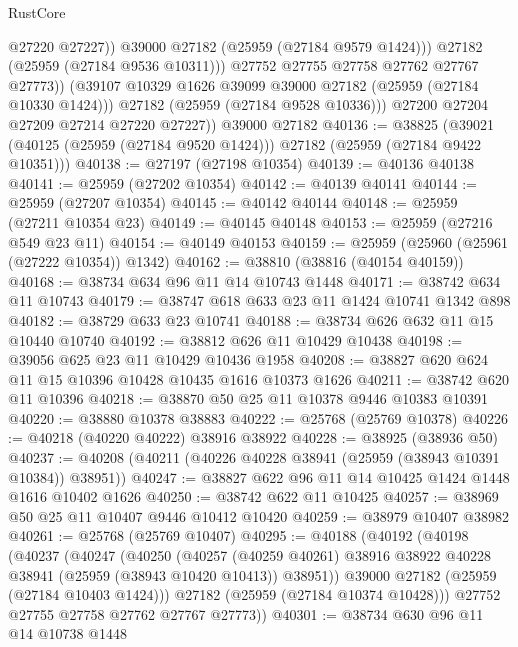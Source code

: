 \begin{lexlean}{RustCore}
\begin{coremodule}
                      @27220
                      @27227))
                  @39000
                  @27182
                  (@25959 (@27184 @9579 @1424)))
                @27182
                (@25959 (@27184 @9536 @10311)))
              @27752
              @27755
              @27758
              @27762
              @27767
              @27773))
          (@39107 @10329 @1626 @39099 @39000 @27182 (@25959 (@27184 @10330 @1424)))
          @27182
          (@25959 (@27184 @9528 @10336)))
        @27200
        @27204
        @27209
        @27214
        @27220
        @27227))
    @39000
    @27182
@40136 := @38825
    (@39021 (@40125 (@25959 (@27184 @9520 @1424))) @27182 (@25959 (@27184 @9422 @10351)))
@40138 := @27197 (@27198 @10354)
@40139 := @40136 @40138
@40141 := @25959 (@27202 @10354)
@40142 := @40139 @40141
@40144 := @25959 (@27207 @10354)
@40145 := @40142 @40144
@40148 := @25959 (@27211 @10354 @23)
@40149 := @40145 @40148
@40153 := @25959 (@27216 @549 @23 @11)
@40154 := @40149 @40153
@40159 := @25959 (@25960 (@25961 (@27222 @10354)) @1342)
@40162 := @38810 (@38816 (@40154 @40159))
@40168 := @38734 @634 @96 @11 @14 @10743 @1448
@40171 := @38742 @634 @11 @10743
@40179 := @38747 @618 @633 @23 @11 @1424 @10741 @1342 @898
@40182 := @38729 @633 @23 @10741
@40188 := @38734 @626 @632 @11 @15 @10440 @10740
@40192 := @38812 @626 @11 @10429 @10438
@40198 := @39056 @625 @23 @11 @10429 @10436 @1958
@40208 := @38827 @620 @624 @11 @15 @10396 @10428 @10435 @1616 @10373 @1626
@40211 := @38742 @620 @11 @10396
@40218 := @38870 @50 @25 @11 @10378 @9446 @10383 @10391
@40220 := @38880 @10378 @38883
@40222 := @25768 (@25769 @10378)
@40226 := @40218 (@40220 @40222) @38916 @38922
@40228 := @38925 (@38936 @50)
@40237 := @40208 (@40211 (@40226 @40228 @38941 (@25959 (@38943 @10391 @10384)) @38951))
@40247 := @38827 @622 @96 @11 @14 @10425 @1424 @1448 @1616 @10402 @1626
@40250 := @38742 @622 @11 @10425
@40257 := @38969 @50 @25 @11 @10407 @9446 @10412 @10420
@40259 := @38979 @10407 @38982
@40261 := @25768 (@25769 @10407)
@40295 := @40188
    (@40192
      (@40198
        (@40237
          (@40247
            (@40250
              (@40257
                (@40259 @40261)
                @38916
                @38922
                @40228
                @38941
                (@25959 (@38943 @10420 @10413))
                @38951))
            @39000
            @27182
            (@25959 (@27184 @10403 @1424)))
          @27182
          (@25959 (@27184 @10374 @10428)))
        @27752
        @27755
        @27758
        @27762
        @27767
        @27773))
@40301 := @38734 @630 @96 @11 @14 @10738 @1448

\end{coremodule}
\end{lexlean}

